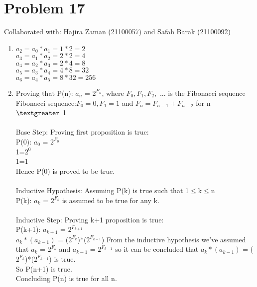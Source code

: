 \documentclass{article}
\begin{document}
\section{Problem 17}
Collaborated with:  Hajira Zaman (21100057) and Safah Barak (21100092)\\
\begin{enumerate}
\item %
$a_{2}=a_{0} *a_{1} = 1*2 = 2$\\
$a_{3}=a_{1} *a_{2} = 2*2 = 4$\\
$a_{4}=a_{2} *a_{3} = 2*4 = 8$\\
$a_{5}=a_{3} *a_{4} = 4*8 = 32$\\
$a_{6}=a_{4} *a_{5} = 8*32 =256$\\
\item %
Proving that P(n): $a_{n}$ = $2^{F_{n}}$, where $F_{0}, F_{1}, F_{2},$ ... is the Fibonacci sequence\\
Fibonacci sequence:$ F_{0}=0, F_{1}=1$ and $F_{n}= F_{n-1} + F_{n-2}$ for n$\textgreater$ 1\\\\
Base Step: Proving first proposition is true:\\
P(0): $a_{0}$ = $2^{F_{0}}$\\
1=$2^{0}$\\
1=1\\
Hence P(0) is proved to be true. \\\\
Inductive Hypothesis: Assuming P(k) is true such that 1$\leq$k$\leq$n\\
P(k): $a_{k}$ = $2^{F_{k}}$ is assumed to be true for any k. \\\\
Inductive Step: Proving  k+1 proposition is true:\\
P(k+1): $a_{k+1}$ = $2^{F_{k+1}}$\\
$a_{k}*(a_{k-1})$ = ($2^{F_{k}}$)*($2^{F_{k-1}}$)
From the inductive hypothesis we've assumed that $a_{k}$ = $2^{F_{k}}$ and $a_{k-1}$ = $2^{F_{k-1}}$ so it can be concluded that $a_{k}*(a_{k-1})$ = ($2^{F_{k}}$)*($2^{F_{k-1}}$) is true.\\
So P(n+1) is true. \\
Concluding P(n) is true for all n.\\

\end{enumerate}
\end{document}
